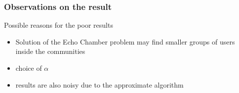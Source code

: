 \documentclass{beamer}
\begin{document}
%
%
%

\begin{frame}[c]
	\frametitle{Observations on the result}
    Possible reasons for the poor results
	\begin{itemize}
        \item Solution of the Echo Chamber problem may find smaller groups of
            users inside the communities

        \item choice of $\alpha$
        \item results are also noisy due to the approximate algorithm
	\end{itemize}
\end{frame}
\end{document}
